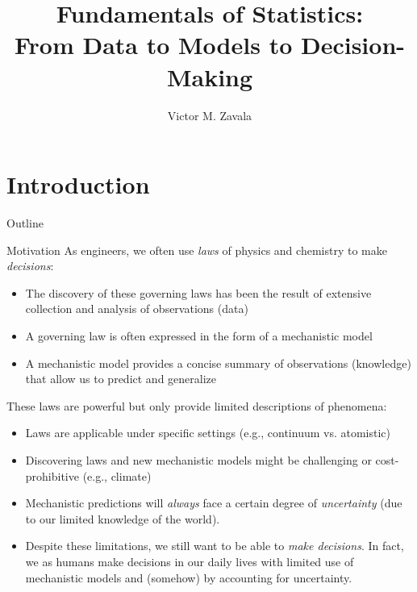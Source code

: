 \documentclass[handout,9pt]{beamer}
\title{\LARGE Fundamentals of Statistics: \\ {\large From Data to Models to Decision-Making}}
\author{Victor M. Zavala}
\institute[UW-Madison] 
{\small
  Department of Chemical and Biological Engineering\\
  University of Wisconsin-Madison\\
\medskip
\textit{victor.zavala@wisc.edu}
}
\date{}
\begin{document}
\begin{frame}
  \titlepage
\end{frame}


\section{Introduction}
\begin{frame}{Outline}
\tableofcontents[currentsection]
\end{frame}

\begin{frame}{Motivation}
As engineers, we often use {\em laws} of physics and chemistry to make {\em decisions}:
      \begin{block}{}
        \begin{itemize}
      \item The discovery of these governing laws has been the result of extensive collection and analysis of observations (data) 
      \item A governing law is often expressed in the form of a mechanistic model
      \item A mechanistic model provides a concise summary of observations (knowledge) that allow us to predict and generalize
      \end{itemize}
      \end{block}
These laws are powerful but only provide limited descriptions of phenomena:
      \begin{block}{}
      \begin{itemize}
      \item Laws are applicable under specific settings (e.g., continuum vs. atomistic) 
      \item Discovering laws and new mechanistic models might be challenging or cost-prohibitive (e.g., climate)
      \end{itemize}
      \end{block}
      \begin{itemize}
      \item Mechanistic predictions will {\em always} face a certain degree of {\em uncertainty} (due to our limited knowledge of the world). 
      \item Despite these limitations, we still want to be able to {\em make decisions}. In fact, we as humans make decisions  in our daily lives with limited use of mechanistic models and (somehow) by accounting for uncertainty. 
      \end{itemize}
\end{frame}
\end{document}
